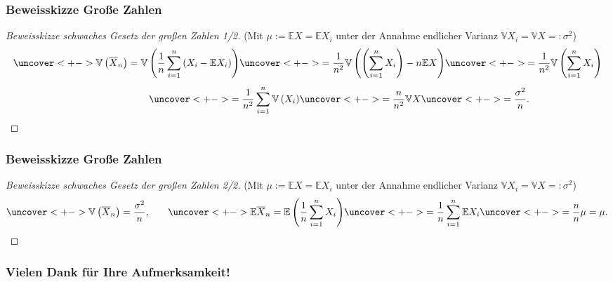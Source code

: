        \begin{frame}
    \frametitle{Beweisskizze Große Zahlen}
    \begin{proof}[Beweisskizze schwaches Gesetz der großen Zahlen 1/2]
      (Mit $\mu := \mathbb{E}X = \mathbb{E}X_i$ unter der Annahme endlicher Varianz $\mathbb{V}X_i = \mathbb{V}X =: \sigma^2$)
      \[\uncover<+->{\mathbb{V}\left(\overline{X}_n\right) = \mathbb{V}\left( \frac{1}{n} \sum_{i=1}^n \left(X_i - \mathbb{E}X_i\right) \right)}  \uncover<+->{= \frac{1}{n^2} \mathbb{V}\left( \left(\sum_{i=1}^n X_i\right) - n\mathbb{E}X \right)} \uncover<+->{= \frac{1}{n^2} \mathbb{V}\left( \sum_{i=1}^n X_i \right)}\]
        \[ \phantom{\frac{1}{n^2} \mathbb{V}\left( \sum_{i=1}^n X_i \right)} \uncover<+->{= \frac{1}{n^2} \sum_{i=1}^n \mathbb{V}\left( X_i \right)} \uncover<+->{= \frac{n}{n^2} \mathbb{V}X} \uncover<+->{= \frac{\sigma^2}{n}.}\]
        \phantom\qedhere %
    \vspace{4cm}  \phantom{text}
  \end{proof}
\end{frame}

\begin{frame}
    \frametitle{Beweisskizze Große Zahlen}
    \begin{proof}[Beweisskizze schwaches Gesetz der großen Zahlen 2/2]
      (Mit $\mu := \mathbb{E}X = \mathbb{E}X_i$ unter der Annahme endlicher Varianz $\mathbb{V}X_i = \mathbb{V}X =: \sigma^2$)
      \[ \uncover<+->{\mathbb{V}\left(\overline{X}_n\right) = \frac{\sigma^2}{n},} \qquad  \uncover<+->{\mathbb{E} \overline{X}_n = \mathbb{E} \left( \frac{1}{n} \sum_{i=1}^n X_i \right)}  \uncover<+->{= \frac{1}{n} \sum_{i=1}^n \mathbb{E}X_i} \uncover<+->{ = \frac{n}{n}\mu = \mu.}\]
    \end{proof}
  \end{frame}





\begin{frame}[separator]
  \frametitle{Vielen Dank für Ihre Aufmerksamkeit!}
\end{frame}



